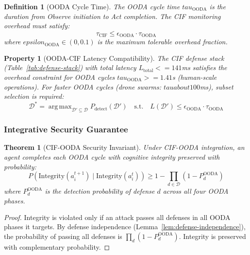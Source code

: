 \documentclass[
]{article}
\newtheorem{definition}{Definition}[section]
\newtheorem{theorem}{Theorem}[section]
\newtheorem{property}{Property}[section]
\DeclareMathOperator*{\argmax}{arg\,max}
\begin{document}
\begin{definition}[OODA Cycle Time]
\label{def:ooda-cycle-time}
The OODA cycle time $tau_{\text{OODA}}$ is the duration from Observe initiation to Act completion. The CIF monitoring overhead must satisfy:
\begin{equation}
\label{eq:ooda-overhead}
\tau_{\text{CIF}} \leq \epsilon_{\text{OODA}} \cdot \tau_{\text{OODA}}
\end{equation}
where $epsilon_{\text{OODA}} \in (0, 0.1)$ is the maximum tolerable overhead fraction.
\end{definition}

\begin{property}[OODA-CIF Latency Compatibility]
\label{prop:ooda-latency}
The CIF defense stack (Table~\ref{tab:defense-stack}) with total latency $L_{\text{total}} <= 141$ms satisfies the overhead constraint for OODA cycles $tau_{\text{OODA}} >= 1.41$s (human-scale operations). For faster OODA cycles (drone swarms: $tau about 100$ms), subset selection is required:
\begin{equation}
\label{eq:ooda-subset}
\mathcal{D}^* = \argmax_{\mathcal{D}' \subseteq \mathcal{D}} P_{\text{detect}}(\mathcal{D}') \quad \text{s.t.} \quad L(\mathcal{D}') \leq \epsilon_{\text{OODA}} \cdot \tau_{\text{OODA}}
\end{equation}
\end{property}

\subsubsection{Integrative Security
Guarantee}\label{integrative-security-guarantee}

\begin{theorem}[CIF-OODA Security Invariant]
\label{thm:cif-ooda-invariant}
Under CIF-OODA integration, an agent completes each OODA cycle with cognitive integrity preserved with probability:
\begin{equation}
\label{eq:cif-ooda-guarantee}
P(\text{Integrity}(a_i^{t+1}) \mid \text{Integrity}(a_i^t)) \geq 1 - \prod_{d \in \mathcal{D}} (1 - P_d^{\text{OODA}})
\end{equation}
where $P_d^{\text{OODA}}$ is the detection probability of defense $d$ across all four OODA phases.
\end{theorem}

\begin{proof}
Integrity is violated only if an attack passes all defenses in all OODA phases it targets. By defense independence (Lemma~\ref{lem:defense-independence}), the probability of passing all defenses is $\prod_d (1 - P_d^{\text{OODA}})$. Integrity is preserved with complementary probability.
\end{proof}
\end{document}
